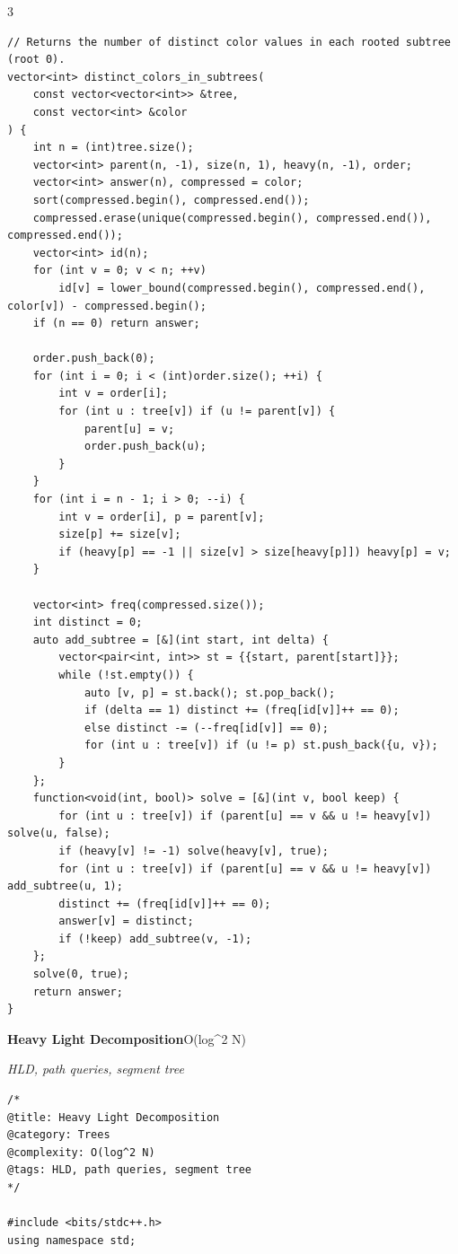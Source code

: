 \documentclass[8pt,a4paper,landscape]{article}
\begin{document}
\begin{multicols}{3}
\begin{lstlisting}
// Returns the number of distinct color values in each rooted subtree (root 0).
vector<int> distinct_colors_in_subtrees(
    const vector<vector<int>> &tree,
    const vector<int> &color
) {
    int n = (int)tree.size();
    vector<int> parent(n, -1), size(n, 1), heavy(n, -1), order;
    vector<int> answer(n), compressed = color;
    sort(compressed.begin(), compressed.end());
    compressed.erase(unique(compressed.begin(), compressed.end()), compressed.end());
    vector<int> id(n);
    for (int v = 0; v < n; ++v)
        id[v] = lower_bound(compressed.begin(), compressed.end(), color[v]) - compressed.begin();
    if (n == 0) return answer;

    order.push_back(0);
    for (int i = 0; i < (int)order.size(); ++i) {
        int v = order[i];
        for (int u : tree[v]) if (u != parent[v]) {
            parent[u] = v;
            order.push_back(u);
        }
    }
    for (int i = n - 1; i > 0; --i) {
        int v = order[i], p = parent[v];
        size[p] += size[v];
        if (heavy[p] == -1 || size[v] > size[heavy[p]]) heavy[p] = v;
    }

    vector<int> freq(compressed.size());
    int distinct = 0;
    auto add_subtree = [&](int start, int delta) {
        vector<pair<int, int>> st = {{start, parent[start]}};
        while (!st.empty()) {
            auto [v, p] = st.back(); st.pop_back();
            if (delta == 1) distinct += (freq[id[v]]++ == 0);
            else distinct -= (--freq[id[v]] == 0);
            for (int u : tree[v]) if (u != p) st.push_back({u, v});
        }
    };
    function<void(int, bool)> solve = [&](int v, bool keep) {
        for (int u : tree[v]) if (parent[u] == v && u != heavy[v]) solve(u, false);
        if (heavy[v] != -1) solve(heavy[v], true);
        for (int u : tree[v]) if (parent[u] == v && u != heavy[v]) add_subtree(u, 1);
        distinct += (freq[id[v]]++ == 0);
        answer[v] = distinct;
        if (!keep) add_subtree(v, -1);
    };
    solve(0, true);
    return answer;
}
\end{lstlisting}
\vspace{1pt}
\textbf{Heavy Light Decomposition}\hfill{\scriptsize O(log\textasciicircum{}2 N)}\par
{\scriptsize\itshape HLD, path queries, segment tree}\par
\begin{lstlisting}
/*
@title: Heavy Light Decomposition
@category: Trees
@complexity: O(log^2 N)
@tags: HLD, path queries, segment tree
*/

#include <bits/stdc++.h>
using namespace std;


\end{lstlisting}
\end{multicols}
\end{document}
